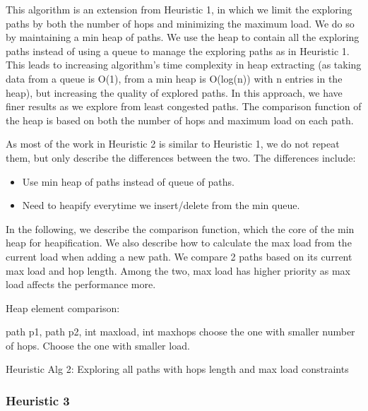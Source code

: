 This algorithm is an extension from Heuristic 1, in which we limit the exploring paths by both the number of hops and minimizing the maximum load. We do so by maintaining a min heap of paths. We use the heap to contain all the exploring paths instead of using a queue to manage the exploring paths as in Heuristic 1. This leads to increasing algorithm's time complexity in heap extracting (as taking data from a queue is O(1), from a min heap is O(log(n)) with n entries in the heap), but increasing the quality of explored paths. In this approach, we have finer results as we explore from least congested paths. The comparison function of the heap is based on both the number of hops and maximum load on each path. 

As most of the work in Heuristic 2 is similar to Heuristic 1, we do not repeat them, but only describe the differences between the two. The differences include:
\begin{itemize}
\item Use min heap of paths instead of queue of paths.
\item Need to heapify everytime we insert/delete from the min queue.
\end{itemize}

In the following, we describe the comparison function, which the core of the min heap for heapification. We also describe how to calculate the max load from the current load when adding a new path. We compare 2 paths based on its current max load and hop length. Among the two, max load has higher priority as max load affects the performance more.

\begin{algorithm}

Heap element comparison:
    \begin{algorithmic}
	 {path p1, path p2, int maxload, int maxhops}
		\State choose the one with smaller number of hops.
	    \EndIf
		\State Choose the one with smaller load.
	    \EndIf
        \EndFunction
    \end{algorithmic}

\caption{Heuristic Alg 2: Exploring all paths with hops length and max load constraints}
\label{alg:h2}
\end{algorithm}

\subsubsection{Heuristic 3}

